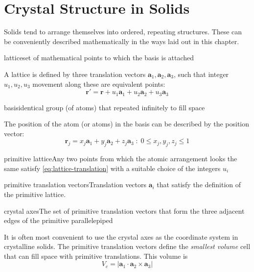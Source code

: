 \chapter{Crystal Structure in Solids}

Solids tend to arrange themselves into ordered, repeating structures. These can be conveniently described mathematically in the ways laid out in this chapter.



\begin{definition}
{lattice}{set of mathematical points to which the basis is attached}
\end{definition}

A lattice is defined by three translation vectors $\mathbf{a}_1, \mathbf{a}_2, \mathbf{a}_3$, such that integer $u_1, u_2, u_3$ movement along these are equivalent points:
\begin{equation} \label{eq:lattice-translation}
    \mathbf{r}' = \mathbf{r} + u_1\mathbf{a}_1 + u_2\mathbf{a}_2 + u_3\mathbf{a}_3
\end{equation}

\begin{definition}
{basis}{identical group (of atoms) that repeated infinitely to fill space}
\end{definition}
The position of the atom (or atoms) in the basis can be described by the position vector:
\begin{equation}
    \mathbf{r}_j = x_j\mathbf{a}_1 + y_j\mathbf{a}_2 + z_j\mathbf{a}_3 \;: \; 0 \leq x_j, y_j, z_j \leq 1 
\end{equation}

\begin{definition}
{primitive lattice}{Any two points from which the atomic arrangement looks the same satisfy \ref{eq:lattice-translation} with a suitable choice of the integers $u_i$}
\end{definition}
\begin{definition}
{primitive translation vectors}{Translation vectors $\mathbf{a}_i$ that satisfy the definition of the primitive lattice.}
\end{definition}

\begin{definition}
{crystal axes}{The set of primitive translation vectors that form the three adjacent edges of the primitive parallelepiped}
\end{definition}
It is often most convenient to use the crystal axes as the coordinate system in crystalline solids. The primitive translation vectors define the \emph{smallest volume} cell that can fill space with primitive translations. This volume is
\begin{equation}
    V_c = |\mathbf{a}_1 \cdot \mathbf{a}_2 \times \mathbf{a}_3|
\end{equation}

